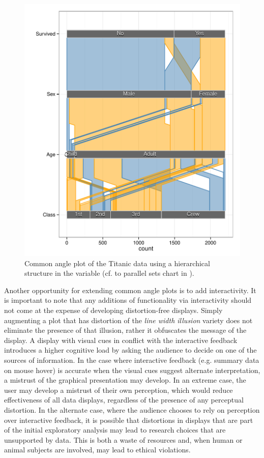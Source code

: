 \documentclass[journal]{vgtc}\usepackage{graphicx, color}
\begin{document}
\begin{figure}[hbtp]
\includegraphics[width=\linewidth]{ca-hierarchy}
\caption{\label{tit-hierarchy} Common angle plot of the Titanic data using a hierarchical structure in the variable (cf. to parallel sets chart in \citep{davies}). }
\end{figure}


Another opportunity for extending common angle plots is to add interactivity. It is important to note that
any additions of functionality via interactivity should not come at the expense of developing distortion-free
displays. Simply augmenting a plot that has distortion of the \emph{line width illusion} variety does not eliminate
the presence of that illusion, rather it obfuscates the message of the display. A display with visual cues in conflict
with the interactive feedback introduces a higher cognitive load by asking the audience to decide on one of the sources of information.
In the case where interactive feedback (e.g. summary data on mouse hover) is accurate when the visual cues
suggest alternate interpretation, a mistrust of the graphical presentation may develop. In an extreme case,
the user may develop a mistrust of their own perception, which would reduce effectiveness of all data displays, 
regardless of the presence of any perceptual distortion. In the alternate case, where the audience chooses to
rely on perception over interactive feedback, it is possible that distortions in displays that are part of 
the initial exploratory analysis may lead to research choices that are unsupported by data. This is both a waste of resources and, when human or animal subjects are involved, may lead to ethical violations.
\end{document}
